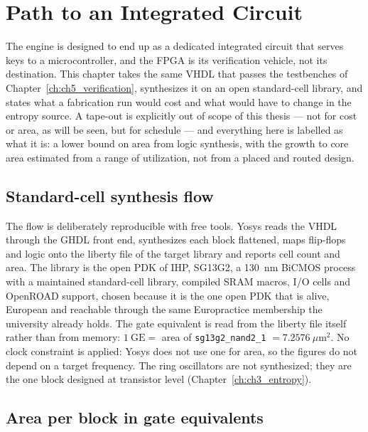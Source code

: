 \chapter{Path to an Integrated Circuit}
\label{ch:ch6_asic}


The engine is designed to end up as a dedicated integrated circuit that
serves keys to a microcontroller, and the FPGA is its verification
vehicle, not its destination. This chapter takes the same VHDL that
passes the testbenches of Chapter~\ref{ch:ch5_verification}, synthesizes
it on an open standard-cell library, and states what a fabrication run
would cost and what would have to change in the entropy source. A
tape-out is explicitly out of scope of this thesis --- not for cost or
area, as will be seen, but for schedule --- and everything here is
labelled as what it is: a lower bound on area from logic synthesis, with
the growth to core area estimated from a range of utilization, not from
a placed and routed design.

\section{Standard-cell synthesis flow}
\label{sec:synthflow}

The flow is deliberately reproducible with free tools. Yosys reads the
VHDL through the GHDL front end, synthesizes each block flattened, maps
flip-flops and logic onto the liberty file of the target library and
reports cell count and area. The library is the open \ac{PDK} of IHP,
SG13G2, a 130~nm BiCMOS process with a maintained standard-cell library,
compiled SRAM macros, I/O cells and OpenROAD support, chosen because it is
the one open \ac{PDK} that is alive, European and reachable through the
same Europractice membership the university already holds. The gate
equivalent is read from the liberty file itself rather than from memory:
$1~\mathrm{GE} = $ area of \texttt{sg13g2\_nand2\_1} $= 7.2576~\mu\mathrm{m}^2$.
No clock constraint is applied: Yosys does not use one for area, so the
figures do not depend on a target frequency. The ring oscillators are not
synthesized; they are the one block designed at transistor level
(Chapter~\ref{ch:ch3_entropy}).

\section{Area per block in gate equivalents}
\label{sec:area}

